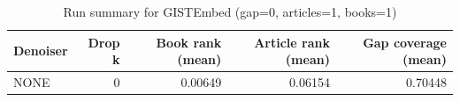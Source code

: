 \begin{table}
\caption{Run summary for GISTEmbed (gap=0, articles=1, books=1)}
\label{tab:summary_gap0_gistembed_a1_b1}
\begin{tabular}{lrrrr}
\toprule
Denoiser & Drop k & Book rank (mean) & Article rank (mean) & Gap coverage (mean) \\
\midrule
NONE & 0 & 0.00649 & 0.06154 & 0.70448 \\
\bottomrule
\end{tabular}
\end{table}